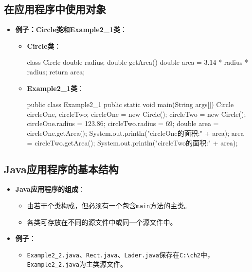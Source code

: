 \documentclass[a4paper, 10pt]{ctexart}
\begin{document}
\subsection{在应用程序中使用对象}
\begin{itemize}
  \item \textbf{例子：Circle类和Example2\_1类}：
  \begin{itemize}
    \item \textbf{Circle类}：
    \begin{codeblock}
class Circle {
    double radius;
    double getArea() {
        double area = 3.14 * radius * radius;
        return area;
    }
}
    \end{codeblock}
    \item \textbf{Example2\_1类}：
    \begin{codeblock}
public class Example2_1 {
    public static void main(String args[]) {
        Circle circleOne, circleTwo;
        circleOne = new Circle();
        circleTwo = new Circle();
        circleOne.radius = 123.86;
        circleTwo.radius = 69;
        double area = circleOne.getArea();
        System.out.println("circleOne的面积:" + area);
        area = circleTwo.getArea();
        System.out.println("circleTwo的面积:" + area);
    }
}
    \end{codeblock}
  \end{itemize}
\end{itemize}

\subsection{Java应用程序的基本结构}
\begin{itemize}
  \item \textbf{Java应用程序的组成}：
  \begin{itemize}
    \item 由若干个类构成，但必须有一个包含\texttt{main}方法的主类。
    \item 各类可存放在不同的源文件中或同一个源文件中。
  \end{itemize}
  \item \textbf{例子}：
  \begin{itemize}
    \item \texttt{Example2\_2.java}、\texttt{Rect.java}、\texttt{Lader.java}保存在\texttt{C:\textbackslash ch2}中，\texttt{Example2\_2.java}为主类源文件。
  \end{itemize}
\end{itemize}
\end{document}
